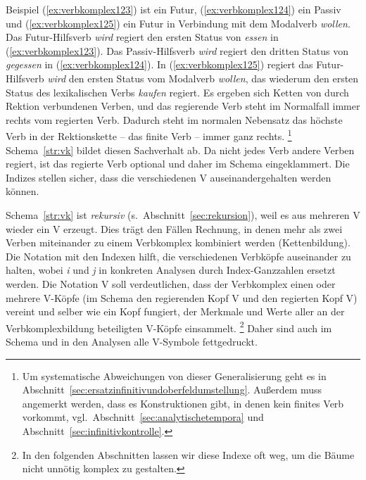 Beispiel (\ref{ex:verbkomplex123}) ist ein Futur, (\ref{ex:verbkomplex124}) ein Passiv und (\ref{ex:verbkomplex125}) ein Futur in Verbindung mit dem Modalverb \textit{wollen}.
Das Futur-Hilfsverb \textit{wird} regiert den ersten Status von \textit{essen} in (\ref{ex:verbkomplex123}).
Das Passiv-Hilfsverb \textit{wird} regiert den dritten Status von \textit{gegessen} in (\ref{ex:verbkomplex124}).
In (\ref{ex:verbkomplex125}) regiert das Futur-Hilfsverb \textit{wird} den ersten Status vom Modalverb \textit{wollen}, das wiederum den ersten Status des lexikalischen Verbs \textit{kaufen} regiert.
Es ergeben sich Ketten von durch Rektion verbundenen Verben, und das regierende Verb steht im Normalfall immer rechts vom regierten Verb.
Dadurch steht im normalen Nebensatz das höchste Verb in der Rektionskette -- das finite Verb -- immer ganz rechts.%
\footnote{Um systematische Abweichungen von dieser Generalisierung geht es in Abschnitt~\ref{sec:ersatzinfinitivundoberfeldumstellung}.
Außerdem muss angemerkt werden, dass es Konstruktionen gibt, in denen kein finites Verb vorkommt, vgl.\ Abschnitt~\ref{sec:analytischetempora} und Abschnitt~\ref{sec:infinitivkontrolle}.}
Schema~\ref{str:vk} bildet diesen Sachverhalt ab.
Da nicht jedes Verb andere Verben regiert, ist das regierte Verb optional und daher im Schema eingeklammert.
Die Indizes stellen sicher, dass die verschiedenen V auseinandergehalten werden können.



Schema~\ref{str:vk} ist \textit{rekursiv} (s.\ Abschnitt~\ref{sec:rekursion}), weil es aus mehreren V wieder ein V erzeugt.
Dies trägt den Fällen Rechnung, in denen mehr als zwei Verben miteinander zu einem Verbkomplex kombiniert werden (Kettenbildung).
Die Notation mit den Indexen hilft, die verschiedenen Verbköpfe auseinander zu halten, wobei \textit{i} und \textit{j} in konkreten Analysen durch Index-Ganzzahlen ersetzt werden.
Die Notation V soll verdeutlichen, dass der Verbkomplex einen oder mehrere V-Köpfe (im Schema den regierenden Kopf V und den regierten Kopf V) vereint und selber wie ein Kopf fungiert, der Merkmale und Werte aller an der Verbkomplexbildung beteiligten V-Köpfe einsammelt.%
\footnote{In den folgenden Abschnitten lassen wir diese Indexe oft weg, um die Bäume nicht unnötig komplex zu gestalten.}
Daher sind auch im Schema und in den Analysen alle V-Symbole fettgedruckt.

